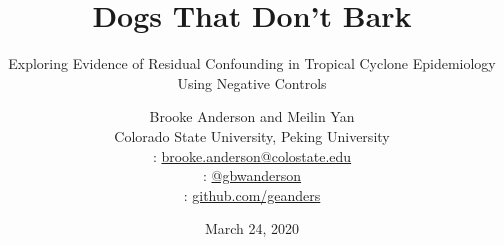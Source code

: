 \usepackage{booktabs}
\usepackage{array}
\usepackage{colortbl}
\usepackage[british]{babel}
\usepackage{graphicx,hyperref,url}
\usepackage{fontawesome}
\usepackage{hyperref}
\usepackage{adjustbox}
\usepackage{appendixnumberbeamer}
\hypersetup{colorlinks=true,allcolors=blue}

\title{Dogs That Don't Bark}
\subtitle{Exploring Evidence of Residual Confounding in Tropical Cyclone Epidemiology Using Negative Controls}
\date{March 24, 2020}

\author[Anderson]{
  Brooke Anderson and Meilin Yan \\ 
  Colorado State University, Peking University \medskip \\ 
  {\small \faEnvelope: \url{brooke.anderson@colostate.edu}} \\
  {\small \faTwitter: \href{www.twitter.com/gbwanderson}{@gbwanderson}} \\
  {\small \faGithub:  \url{github.com/geanders}}
  }


